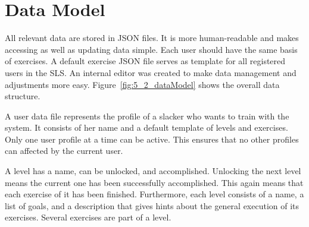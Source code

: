 \section{Data Model}\label{5_2_dataModel}
All relevant data are stored in JSON files. It is more human-readable and makes accessing as well as updating data simple. Each user should have the same basis of exercises. A default exercise JSON file serves as template for all registered users in the SLS. An internal editor was created to make data management and adjustments more easy. Figure~\ref{fig:5_2_dataModel} shows the overall data structure.

A user data file represents the profile of a slacker who wants to train with the system. It consists of her name and a default template of levels and exercises. Only one user profile at a time can be active. This ensures that no other profiles can affected by the current user.

A level has a name, can be unlocked, and accomplished. Unlocking the next level means the current one has been successfully accomplished. This again means that each exercise of it has been finished. Furthermore, each level consists of a name, a list of goals, and a description that gives hints about the general execution of its exercises.
Several exercises are part of a level.

